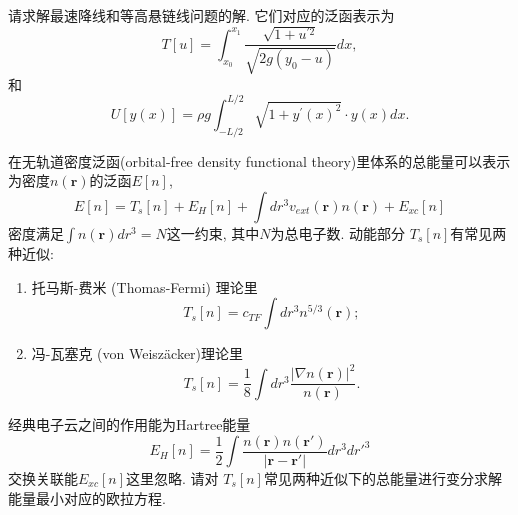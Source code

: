 \documentclass[10pt]{article}
\newenvironment{problem}[2][]{\begin{trivlist}
\item[\hskip \labelsep {\bfseries #1}\hskip \labelsep {\bfseries #2}]}{\end{trivlist}}
\begin{document}
\begin{problem}{5.7}
请求解最速降线和等高悬链线问题的解.
它们对应的泛函表示为
$$
T[u] = \int_{x_0}^{x_1} \frac{\sqrt{1+u^{\prime 2}}}{\sqrt{2 g\left(y_0-u\right)}} d x, 
$$
和
$$
U[y(x)]= \rho g  \int_{-L / 2}^{L / 2} \sqrt{1+y^{\prime}(x)^2} \cdot y(x) d x. 
$$
\end{problem}



\begin{problem}{5.8}
在无轨道密度泛函(orbital-free density functional theory)里体系的总能量可以表示为密度$n(\mathbf{r})$的泛函$E[n]$,
$$
E[n] = T_s[n] + E_H[n] + \int dr^3 v_{ext}(\mathbf{r}) n(\mathbf{r}) + E_{xc}[n]
$$
密度满足$\int n(\mathbf{r}) dr^3 = N$这一约束, 其中$N$为总电子数.
动能部分 $T_s[n]$有常见两种近似:
\begin{enumerate}
  \item 托马斯-费米 (Thomas-Fermi) 理论里
  $$
  T_s[n] = c_{T F} \int dr^3 n^{5 / 3}(\mathbf{r});
  $$ 
  \item 冯-瓦塞克 (von Weisz\"acker)理论里
  $$
  T_s[n] =  \frac{1}{8} \int dr^3 \frac{|\nabla n(\mathbf{r})|^2}{n(\mathbf{r})}.
  $$
\end{enumerate}
经典电子云之间的作用能为Hartree能量
$$
E_H[n] = 
 \frac{1}{2} 
 \int \frac{n(\mathbf{r}) n(\mathbf{r}')}{|\mathbf{r} - \mathbf{r}'|}
 dr^3 dr'^3
$$
交换关联能$ E_{xc}[n]$这里忽略. 请对 $T_s[n]$常见两种近似下的总能量进行变分求解能量最小对应的欧拉方程.
\end{problem}
  
\end{document}
